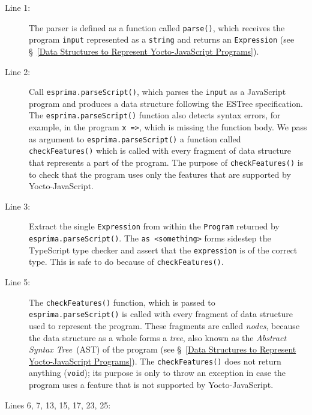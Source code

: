 \documentclass[12pt, oneside]{book}
\begin{document}
\begin{description}
\item [Line 1:]

The parser is defined as a function called \texttt{parse()}, which receives the program \texttt{input} represented as a \texttt{string} and returns an \texttt{Expression} (see §~\ref{Data Structures to Represent Yocto-JavaScript Programs}).

\item [Line 2:]

Call \texttt{esprima.parseScript()}, which parses the \texttt{input} as a JavaScript program and produces a data structure following the ESTree specification. The \texttt{esprima.parseScript()} function also detects syntax errors, for example, in the program \texttt{x =>}, which is missing the function body. We pass as argument to \texttt{esprima.parseScript()} a function called \texttt{checkFeatures()} which is called with every fragment of data structure that represents a part of the program. The purpose of \texttt{checkFeatures()} is to check that the program uses only the features that are supported by Yocto-JavaScript.

\item [Line 3:]

Extract the single \texttt{Expression} from within the \texttt{Program} returned by \texttt{esprima.parseScript()}. The \texttt{as <something>} forms sidestep the TypeScript type checker and assert that the \texttt{expression} is of the correct type. This is safe to do because of \texttt{checkFeatures()}.

\item [Line 5:]

The \texttt{checkFeatures()} function, which is passed to \texttt{esprima.parseScript()} is called with every fragment of data structure used to represent the program. These fragments are called \emph{nodes}, because the data structure as a whole forms a \emph{tree}, also known as the \emph{Abstract Syntax Tree}~(AST) of the program (see §~\ref{Data Structures to Represent Yocto-JavaScript Programs}). The \texttt{checkFeatures()} does not return anything (\texttt{void}); its purpose is only to throw an exception in case the program uses a feature that is not supported by Yocto-JavaScript.

\item [Lines 6, 7, 13, 15, 17, 23, 25:]


\end{description}
\end{document}
